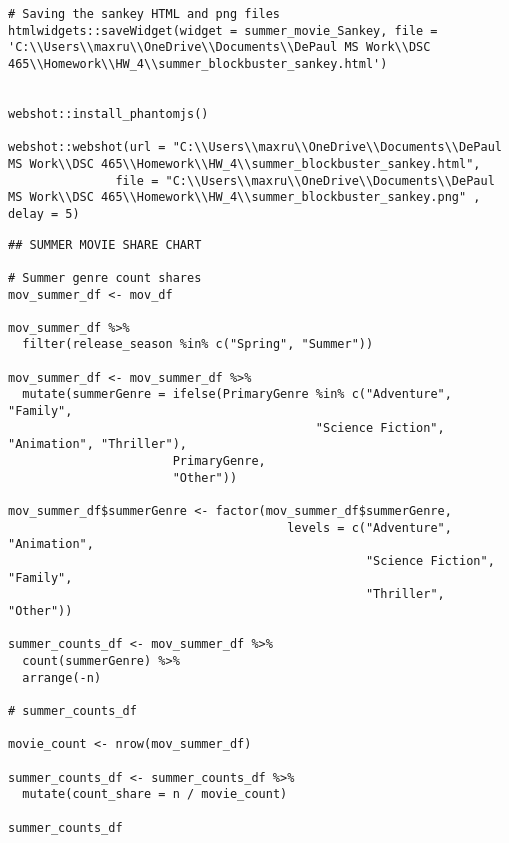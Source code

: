 \begin{lstlisting}
# Saving the sankey HTML and png files
htmlwidgets::saveWidget(widget = summer_movie_Sankey, file = 'C:\\Users\\maxru\\OneDrive\\Documents\\DePaul MS Work\\DSC 465\\Homework\\HW_4\\summer_blockbuster_sankey.html')


webshot::install_phantomjs()

webshot::webshot(url = "C:\\Users\\maxru\\OneDrive\\Documents\\DePaul MS Work\\DSC 465\\Homework\\HW_4\\summer_blockbuster_sankey.html",
               file = "C:\\Users\\maxru\\OneDrive\\Documents\\DePaul MS Work\\DSC 465\\Homework\\HW_4\\summer_blockbuster_sankey.png" , delay = 5)
\end{lstlisting}

\begin{lstlisting}
## SUMMER MOVIE SHARE CHART

# Summer genre count shares
mov_summer_df <- mov_df

mov_summer_df %>%
  filter(release_season %in% c("Spring", "Summer"))

mov_summer_df <- mov_summer_df %>%
  mutate(summerGenre = ifelse(PrimaryGenre %in% c("Adventure", "Family",
                                           "Science Fiction", "Animation", "Thriller"),
                       PrimaryGenre,
                       "Other"))

mov_summer_df$summerGenre <- factor(mov_summer_df$summerGenre, 
                                       levels = c("Adventure", "Animation",
                                                  "Science Fiction", "Family",
                                                  "Thriller", "Other"))

summer_counts_df <- mov_summer_df %>%
  count(summerGenre) %>%
  arrange(-n)

# summer_counts_df

movie_count <- nrow(mov_summer_df)

summer_counts_df <- summer_counts_df %>%
  mutate(count_share = n / movie_count)

summer_counts_df
\end{lstlisting}

